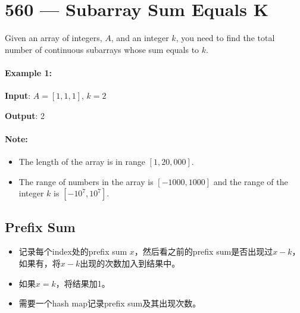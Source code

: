 \section{560 --- Subarray Sum Equals K}
Given an array of integers, $A$, and an integer $ k $, you need to find the total number of continuous subarrays whose sum equals to $ k $.

\paragraph{Example 1:}
\begin{flushleft}
\textbf{Input}: $A = [1,1,1]$, $k = 2$

\textbf{Output}: 2
\end{flushleft}

\paragraph{Note:}
\begin{itemize}
\item The length of the array is in range $[1, 20,000]$.

\item The range of numbers in the array is $[-1000, 1000]$ and the range of the integer $k$ is $[-10^7, 10^7]$.
\end{itemize}

\subsection{Prefix Sum}
\begin{itemize}
\item 记录每个index处的prefix sum $x$，然后看之前的prefix sum是否出现过$x-k$，如果有，将$x-k$出现的次数加入到结果中。
\item 如果$x=k$，将结果加1。
\item 需要一个hash map记录prefix sum及其出现次数。
\end{itemize}

